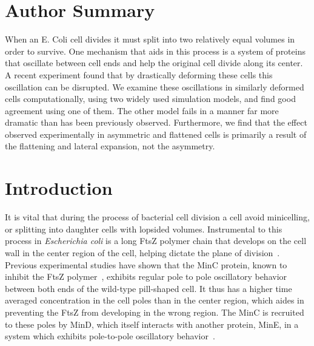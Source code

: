 \documentclass[10pt,letterpaper]{article}
\begin{document}
\section*{Author Summary}
  When an E. Coli cell divides it must split into two relatively equal
  volumes in order to survive.  One mechanism that aids in this
  process is a system of proteins that oscillate between cell ends and
  help the original cell divide along its center.  A recent experiment
  found that by drastically deforming these cells this oscillation can
  be disrupted.  We examine these oscillations in similarly deformed
  cells computationally, using two widely used simulation models, and
  find good agreement using one of them.  The other model fails in a
  manner far more dramatic than has been previously observed.
  Furthermore, we find that the effect observed experimentally in
  asymmetric and flattened cells is primarily a result of the
  flattening and lateral expansion, not the asymmetry.

\linenumbers

\section*{Introduction}
It is vital that during the process of bacterial cell
division a cell avoid minicelling, or splitting into daughter cells
with lopsided volumes.  Instrumental to this process in
\emph{Escherichia coli} is a long FtsZ polymer chain that develops on
the cell wall in the center region of the cell, helping dictate the
plane of division~\cite{adams2009bacterial,
  lutkenhaus2007assembly}. Previous experimental studies have shown
that the MinC protein, known to inhibit the FtsZ
polymer~\cite{shen2010examination}, exhibits regular pole to pole
oscillatory behavior between both ends of the wild-type pill-shaped
cell.  It thus has a higher time averaged concentration in the cell
poles than in the center region, which aides in preventing the FtsZ
from developing in the wrong region.  The MinC is recruited to these
poles by MinD, which itself interacts with another protein, MinE, in a
system which exhibits pole-to-pole oscillatory
behavior~\cite{shapiro2009and, yu1999ftsz,
  meacci2005min,huang2003dynamic,kerr2006division,mannik2009bacterial}.
\end{document}

